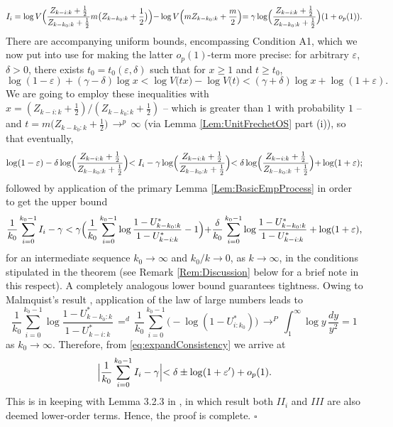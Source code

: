 \documentclass[11pt, a4paper, oneside]{article}
\numberwithin{equation}{section}
\theoremstyle{plain}
\theoremstyle{definition}
\newenvironment{pfofThm}{\noindent{\bf Proof of Theorem}}{\hfill $\square$ \\}
\newcommand{\id}{\ensuremath{\displaystyle{\mathop {=} ^d}}}
\newcommand{\intab}[2]{\ensuremath{\int_{#1}^{#2}}}
\newcommand{\conv}[1]{\ensuremath{\, \displaystyle {\mathop{\longrightarrow}^{#1}}}\, }
\begin{document}
\begin{pfofThm}
\begin{equation*}
   I_i =\log V\Bigl(\frac{Z_{k-i:k}+\frac{1}{2}}{Z_{k-k_{0}:k}+\frac{1}{2}}m\bigl(Z_{k-k_{0}:k}+\frac{1}{2}\bigl)\Bigl)-\log V\Bigl(mZ_{k-k_{0}:k}+\frac{m}{2}\Bigl)
   =\gamma\log\Bigl(\frac{Z_{k-i:k}+\frac{1}{2}}{Z_{k-k_{0}:k}+\frac{1}{2}}\Bigl)(1+o_{p}(1)).
\end{equation*}
There are accompanying uniform bounds, encompassing Condition A1, which we now put into use for making the latter $o_{p}(1)$-term more precise: for arbitrary $\varepsilon$, $\delta>0$, there exists $t_{0}=t_{0}(\varepsilon,\delta)$ such that for $x\geq 1$ and $t\geq t_{0}$,
%
\begin{equation*}
     \log(1-\varepsilon)+(\gamma-\delta)\log x<\log V \bigl(tx\bigl) - \log V\bigl(t\bigr)<(\gamma+\delta)\log x + \log(1+\varepsilon).
\end{equation*}
%
We are going to employ these inequalities with $x =(Z_{k-i:k}+\frac{1}{2})/(Z_{k-k_{0}:k}+\frac{1}{2})$ -- which is greater than $1$ with probability $1$ -- and $t= m\bigl(Z_{k-k_{0}:k}+\frac{1}{2}\bigl)\conv{p} \infty$ (via Lemma \ref{Lem:UnitFrechetOS} part (i)), so that eventually, 
\begin{equation*}
     \log(1-\varepsilon)-\delta\log\Bigl(\frac{Z_{k-i:k}+\frac{1}{2}}{Z_{k-k_{0}:k}+\frac{1}{2}}\Bigl) <I_{i}-\gamma\log\Bigl(\frac{Z_{k-i:k}+\frac{1}{2}}{Z_{k-k_{0}:k}+\frac{1}{2}}\Bigl)<\delta\log\Bigl(\frac{Z_{k-i:k}+\frac{1}{2}}{Z_{k-k_{0}:k}+\frac{1}{2}}\Bigl)+ \log(1+\varepsilon);
\end{equation*}
 followed by application of the primary Lemma \ref{Lem:BasicEmpProcess} in order to get the upper bound
\begin{equation}\label{eq:expandConsistency}
     \frac{1}{k_{0}}\sum_{i=0} ^{k_{0}-1}I_{i}-\gamma <\gamma\Bigl(\frac{1}{k_{0}}\sum_{i=0} ^{k_{0}-1}\log\frac{1-U^{*}_{k-k_{0}:k}}{1-U^{*}_{k-i:k}}-1\Bigl)+\frac{\delta}{k_{0}}\sum_{i=0} ^{k_{0}-1}\log\frac{1-U^{*}_{k-k_{0}:k}}{1-U^{*}_{k-i:k}}+\log (1+\varepsilon),
\end{equation}
for an intermediate sequence $k_0 \rightarrow \infty$ and $k_0/k \rightarrow 0$, as $k \rightarrow \infty$, in the conditions stipulated in the theorem (see Remark \ref{Rem:Discussion} below for a brief note in this respect).
A completely analogous lower bound guarantees tightness. Owing to Malmquist's result \citep[see][p.41]{Reiss1989}, application of the law of large numbers leads to
\begin{equation*}
  \frac{1}{k_{0}}\sum_{i=0} ^{k_{0}-1}\log\frac{1-U^{*}_{k-k_{0}:k}}{1-U^{*}_{k-i:k}} \, \id \, \frac{1}{k_{0}} \sum_{i=0} ^{k_{0}-1} \bigl( - \log (1- U^{*}_{i:k_0}) \bigr) \conv{P}\intab{1}{\infty}\log y\, \frac{dy}{y^{2}}=1 \end{equation*}
as $k_0 \rightarrow \infty$. Therefore, from \eqref{eq:expandConsistency} we arrive at 
\begin{equation*}
    \Bigl|\frac{1}{k_{0}}\sum_{i=0} ^{k_{0}-1}I_{i}-\gamma\Bigl|<\delta \pm \log(1+\varepsilon')+o_{p}(1).
\end{equation*}
This is in keeping with Lemma 3.2.3 in \citet{deHaanFerreira2006}, in which result both $II_i$ and $III$ are also deemed lower-order terms. Hence, the proof is complete.
\end{pfofThm}
\end{document}

